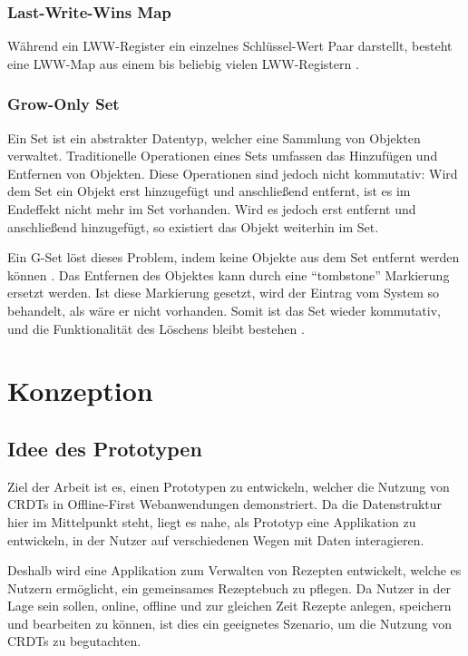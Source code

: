 \documentclass[a4paper, 12pt]{scrreprt}
\begin{document}
\subsection{Last-Write-Wins Map}
\label{lwwMap}
\sloppypar
Während ein \ac{LWW-Register} ein einzelnes Schlüssel-Wert Paar darstellt, besteht eine LWW-Map aus einem bis beliebig vielen LWW-Registern \autocite[43]{PhdthesisLwwMap}.


\subsection{Grow-Only Set}
\label{sec:g-set}
Ein Set ist ein abstrakter Datentyp, welcher eine Sammlung von Objekten verwaltet. Traditionelle Operationen eines Sets umfassen das Hinzufügen und Entfernen von Objekten. Diese Operationen sind jedoch nicht kommutativ: Wird dem Set ein Objekt erst hinzugefügt und anschließend entfernt, ist es im Endeffekt nicht mehr im Set vorhanden. Wird es jedoch erst entfernt und anschließend hinzugefügt, so existiert das Objekt weiterhin im Set.

Ein \ac{G-Set} löst dieses Problem, indem keine Objekte aus dem Set entfernt werden können  \autocite[S.17]{ArticlePureOP}. Das Entfernen des Objektes kann durch eine \enquote{tombstone} Markierung ersetzt werden. Ist diese Markierung gesetzt, wird der Eintrag vom System so behandelt, als wäre er nicht vorhanden. Somit ist das Set wieder kommutativ, und die Funktionalität des Löschens bleibt bestehen \autocite[S.7]{InproceedingsTombstone}.


\chapter{Konzeption}

\section{Idee des Prototypen}
Ziel der Arbeit ist es, einen Prototypen zu entwickeln, welcher die Nutzung von \acp{CRDT} in Offline-First Webanwendungen demonstriert. Da die Datenstruktur hier im Mittelpunkt steht, liegt es nahe, als Prototyp eine Applikation zu entwickeln, in der Nutzer auf verschiedenen Wegen mit Daten interagieren.

Deshalb wird eine Applikation zum Verwalten von Rezepten entwickelt, welche es Nutzern ermöglicht, ein gemeinsames Rezeptebuch zu pflegen. Da Nutzer in der Lage sein sollen, online, offline und zur gleichen Zeit Rezepte anlegen, speichern und bearbeiten zu können, ist dies ein geeignetes Szenario, um die Nutzung von \acp{CRDT} zu begutachten. 
\end{document}
